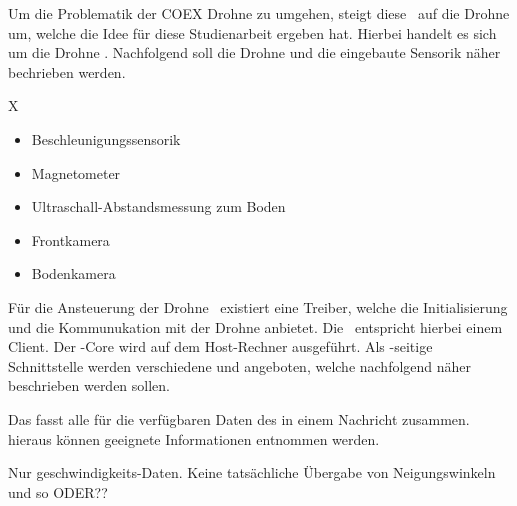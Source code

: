 
Um die Problematik der COEX Drohne zu umgehen, steigt diese \Arbeit\ auf die Drohne um, welche die Idee für diese Studienarbeit ergeben hat.
Hierbei handelt es sich um die Drohne \Ar. Nachfolgend soll die Drohne und die eingebaute Sensorik näher bechrieben werden.





\missing

X


\missing






\begin{itemize}
\item Beschleunigungssensorik
\item Magnetometer
\item Ultraschall-Abstandsmessung zum Boden
\item Frontkamera
\item Bodenkamera
\end{itemize}








Für die Ansteuerung der Drohne \Ar\ existiert eine Treiber, welche die Initialisierung und die Kommunukation mit der Drohne anbietet. Die \Ar\ entspricht hierbei einem Client. Der \ROS-Core wird auf dem Host-Rechner ausgeführt.
Als \ROS-seitige Schnittstelle werden verschiedene \Topic[s] und \Service[s] angeboten, welche nachfolgend näher beschrieben werden sollen.










Das  fasst alle für die verfügbaren Daten des \Quad[s] in einem Nachricht zusammen. hieraus können geeignete Informationen entnommen werden.


Nur geschwindigkeits-Daten. Keine tatsächliche Übergabe von Neigungswinkeln und so ODER??
\missing\


